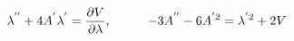 \begin{equation} \label{e1}
\lambda^{''} + 4 A^{'} \lambda^{'} = {\partial V \over \partial \lambda},
\hspace{1cm}
-3 A^{''} - 6 A^{'2} = \lambda^{'2} + 2 V
\end{equation}

